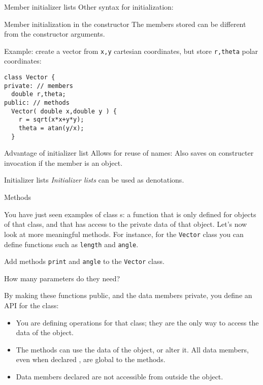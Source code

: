 \begin{block}{Member initializer lists}
  \label{sl:class-init}
  Other syntax for initialization:
\end{block}

\begin{block}{Member initialization in the constructor}
  \label{sl:class-set}
  The members stored can be different from the constructor arguments.

  Example: create a vector from \lstinline{x,y} cartesian coordinates,
  but store \lstinline{r,theta} polar coordinates:

\begin{lstlisting}
class Vector {
private: // members
  double r,theta;
public: // methods
  Vector( double x,double y ) {
    r = sqrt(x*x+y*y);
    theta = atan(y/x);
  }
\end{lstlisting}
\end{block}

\begin{block}{Advantage of initializer list}
  \label{sl:class-init-why}
  Allows for reuse of names:
  Also saves on constructer invocation if the member is an object.
\end{block}

\begin{block}{Initializer lists}
  \label{sl:class-inlist}
  \emph{Initializer lists} can be used as denotations.
\end{block}

 {Methods}

You have just seen examples of class
s: a function that is only defined for objects of
that class, and that has access to the private data of that object.
Let's now look at more meaningful methods. For instance, for the
\lstinline{Vector} class you can define functions such as \lstinline{length} and
\lstinline{angle}. 
%

\begin{exercise}
  \label{ex:vectorclass-print}
  Add methods \lstinline{print} and \lstinline{angle} to the \lstinline{Vector} class.

  How many parameters do they need?
\end{exercise}

By making these functions public, and the data members
private, you define an \acf{API} for the class:
\begin{itemize}
\item You are defining operations for that class; they are the only
  way to access the data of the object.
\item The methods can use the data of the object, or alter it. All
  data members, even when declared , are global to the methods.
\item  Data members declared  are not accessible from outside the
  object.
\end{itemize}

